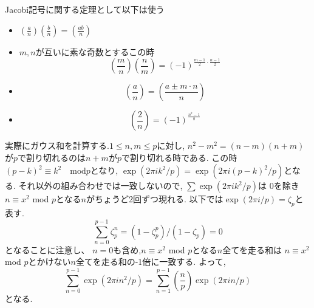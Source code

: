Jacobi記号に関する定理として以下は使う
\begin{lem}
\begin{itemize}
    \item $\left( \frac{a}{n} \right) \left( \frac{b}{n}\right) = \left(  \frac{ab}{n}\right)$
    \item $m,n$が互いに素な奇数とするこの時
    \begin{equation*}
       \left(\frac{m}{n}\right)\left(\frac{n}{m}\right)=(-1)^{\frac{m-1}{2} \cdot \frac{n-1}{2}}
    \end{equation*}
    \item 
    \begin{equation*}
    \left(\frac{a}{n}\right)=\left(\frac{a \pm m \cdot n}{n}\right)
    \end{equation*}
    \item 
    \begin{equation*}
    \left(\frac{2}{n}\right)=(-1)^{\frac{n^{2} - 1}{8}}
    \end{equation*}
\end{itemize}
\end{lem}

実際にガウス和を計算する.$1 \le n, m \le p$に対し,
$n^2 - m^2 = (n-m)(n+m)$が$p$で割り切れるのは$n+m$が$p$で割り切れる時である.
この時$(p-k)^2 \equiv k^2 \quad \mathrm{mod} p$となり,
$\exp(2 \pi i k^2/p) = \exp(2 \pi i (p-k)^2/p)$となる.
それ以外の組み合わせでは一致しないので,
$\sum \exp( 2\pi i k^2/ p)$は
$0$を除き$n \equiv x^2$ mod $p$となる$n$がちょうど2回ずつ現れる.
以下では$ \exp( 2\pi i / p) = \zeta_p$と表す.
\begin{equation*}
\sum_{n=0}^{p-1}  \zeta_p^n = (1 - \zeta_p^p) / (1 -\zeta_p) = 0
\end{equation*}
となることに注意し、
$n=0$も含め,$n \equiv x^2$ mod $p$となる$n$全てを走る和は
$n \equiv x^2$ mod $p$とかけない$n$全てを走る和の-1倍に一致する.
よって,
\begin{equation*}
\sum_{n=0}^{p-1} \exp(2\pi i n^2/p) = \sum_{n =1}^{p-1}  \left(\frac{n}{p}\right)\exp(2 \pi i n/p)
\end{equation*}
となる.

